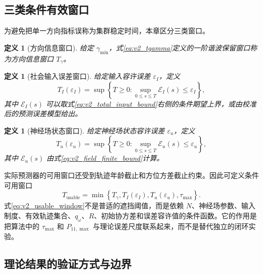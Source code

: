 \documentclass[UTF8,fontset=windows,11pt]{ctexart}
\newtheorem{definition}[theorem]{定义}
\begin{document}
\subsection{三类条件有效窗口}

为避免把单一方向指标误称为集群稳定时间，本章区分三类窗口。

\begin{definition}[方向信息窗口]
\label{def:v2_direction_window}
给定 $\gamma_{\min}$，式\eqref{eq:v2_tgamma}定义的一阶谐波保留窗口称为方向信息窗口 $T_\gamma$。
\end{definition}

\begin{definition}[社会输入误差窗口]
\label{def:v2_input_window}
给定输入容许误差 $\varepsilon_I$，定义
\begin{equation}
 T_I(\varepsilon_I)=\sup\left\{T\ge0:
 \sup_{0\le s\le T}\mathcal E_I(s)\le\varepsilon_I\right\},
 \label{eq:v2_input_window}
\end{equation}
其中 $\mathcal E_I(s)$ 可以取式\eqref{eq:v2_total_input_bound}右侧的条件期望上界，或由校准后的预测误差模型给出。
\end{definition}

\begin{definition}[神经场状态窗口]
\label{def:v2_field_window}
给定神经场状态容许误差 $\varepsilon_u$，定义
\begin{equation}
 T_u(\varepsilon_u)=\sup\left\{T\ge0:
 \sup_{0\le s\le T}\mathcal E_u(s)\le\varepsilon_u\right\},
 \label{eq:v2_field_window}
\end{equation}
其中 $\mathcal E_u(s)$ 由式\eqref{eq:v2_field_finite_bound}计算。
\end{definition}

实际预测器的可用窗口还受到轨迹年龄截止和方位方差截止约束。因此可定义条件可用窗口
\begin{equation}
 T_{\mathrm{usable}}
 =\min\left\{T_\gamma,
 T_I(\varepsilon_I),
 T_u(\varepsilon_u),
 \tau_{\max}\right\}.
 \label{eq:v2_usable_window}
\end{equation}
式\eqref{eq:v2_usable_window}不是普适的遮挡阈值，而是依赖 $N$、神经场参数、输入制度、有效轨迹集合、$q_\omega$、$R$、初始协方差和误差容许值的条件函数。它的作用是把算法中的 $\tau_{\max}$ 和 $P_{11,\max}$ 与理论误差尺度联系起来，而不是替代独立的闭环实验。

\subsection{理论结果的验证方式与边界}
\end{document}
